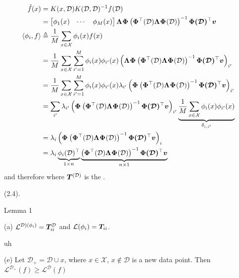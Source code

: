 \documentclass[11pt]{article}
\renewcommand\vec[2][]{\bm{#2}_{#1}}
\newcommand\mc{\mathcal}
\begin{document}
\begin{align}
	\hat f(x)
		&= K(x, \mc D) K(\mc D, \mc D)^{-1} f(\mc D) \\
		&= \begin{bmatrix} \phi_1(x) & \cdots & \phi_M(x) \end{bmatrix}
		\matr \Lambda \matr\Phi 
		\lr{\matr{\Phi}^\top(\mc D) \matr\Lambda \matr{\Phi}(\mc D)}^{-1} \matr{\Phi(\mc D)}^\top \vec v \\
	\innerprod{\phi_i}{f}
		&\triangleq \inv{M} \sum_{x \in \mc X} \phi_i(x) f(x) \\
		&= \inv{M} \sum_{x \in \mc X} \sum_{i' = 1}^{M}  \phi_i(x) \phi_{i'}(x) 
			\lr{ \matr \Lambda \matr\Phi 
		\lr{\matr{\Phi}^\top(\mc D) \matr\Lambda \matr{\Phi}(\mc D)}^{-1} \matr{\Phi(\mc D)}^\top \vec v }_{i'} \\
	&= \inv{M} \sum_{x \in \mc X} \sum_{i' = 1}^{M}  \phi_i(x) \phi_{i'}(x)  \lambda_{i'}
	\lr{ \matr\Phi 
		\lr{\matr{\Phi}^\top(\mc D) \matr \Lambda \matr{\Phi}(\mc D)}^{-1} \matr{\Phi(\mc D)}^\top \vec v }_{i'} \\
	&= \sum_{i'}  \lambda_{i'}
	\lr{ \matr\Phi 
		\lr{\matr{\Phi}^\top(\mc D) \matr \Lambda \matr{\Phi}(\mc D)}^{-1} \matr{\Phi(\mc D)}^\top \vec v }_{i'} \underbrace{  \inv{M}\sum_{x \in \mc X} \phi_i(x) \phi_{i'}(x)   }_{\delta_{i,i'}} \\
	&=  \lambda_{i}
	\lr{ \matr\Phi 
		\lr{\matr{\Phi}^\top(\mc D) \matr \Lambda  \matr{\Phi}(\mc D)}^{-1} \matr{\Phi(\mc D)}^\top \vec v }_{i} \\
	&= \lambda_i \underbrace{ \phi_i(\mc D)^\top }_{1 \times n} \underbrace{	\lr{\matr{\Phi}^\top(\mc D) \matr \Lambda  \matr{\Phi}(\mc D)}^{-1} \matr{\Phi(\mc D)}^\top \vec v }_{n \times 1}
\end{align}
and therefore
\graybox{
	\vec{\hat v}
		&=  \underbrace{ \matr \Lambda \matr\Phi(\mc D)   \lr{ \matr{\Phi}^\top(\mc D) \matr \Lambda \matr\Phi(\mc D) }^{-1} \matr{\Phi}^\top (\mc D) }_{\triangleq \matr{T}^{(\mc D)}} \vec v 
}
where $\matr{T}^{(\mc D)}$ is the . 

 (2.4). 

\begin{itemdefinition}{Lemma 1}{}
	\item[(a)] $\mc L^{\mc D)(\phi_i)} = \matr[ii]{T}^{\mc D}$ and $\mc L(\phi_i) = \matr[ii]{T}$. 
	\item uh
	\item[(e)] Let $\mc D_{+} = \mc D \cup x$, where $x \in \mc X$, $x \notin \mc D$ is a new data point. Then $\mc{L}^{\mc D_+} (f) \geq \mc L^{\mc D}(f)$
\end{itemdefinition}
\end{document}

